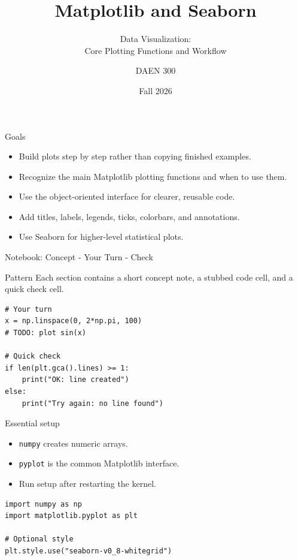 \documentclass[aspectratio=43,11pt]{beamer}
\title{Matplotlib and Seaborn}
\subtitle{Data Visualization:\\Core Plotting Functions and Workflow}
\author{DAEN 300}
\date{Fall 2026}
\begin{document}
\begin{frame}
  \titlepage
\end{frame}

\begin{frame}{Goals}
\begin{itemize}
  \item Build plots step by step rather than copying finished examples.
  \item Recognize the main Matplotlib plotting functions and when to use them.
  \item Use the object-oriented interface for clearer, reusable code.
  \item Add titles, labels, legends, ticks, colorbars, and annotations.
  \item Use Seaborn for higher-level statistical plots.
\end{itemize}
\end{frame}

\begin{frame}[fragile]{Notebook: Concept - Your Turn - Check}
\begin{block}{Pattern}
Each section contains a short concept note, a stubbed code cell, and a quick check cell.
\end{block}

\begin{lstlisting}
# Your turn
x = np.linspace(0, 2*np.pi, 100)
# TODO: plot sin(x)

# Quick check
if len(plt.gca().lines) >= 1:
    print("OK: line created")
else:
    print("Try again: no line found")
\end{lstlisting}
\end{frame}

\begin{frame}[fragile]{Essential setup}
\begin{itemize}
  \item \texttt{numpy} creates numeric arrays.
  \item \texttt{pyplot} is the common Matplotlib interface.
  \item Run setup after restarting the kernel.
\end{itemize}

\begin{lstlisting}
import numpy as np
import matplotlib.pyplot as plt

# Optional style
plt.style.use("seaborn-v0_8-whitegrid")
\end{lstlisting}
\end{frame}
\end{document}
